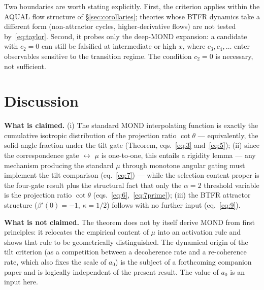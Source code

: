 \documentclass[11pt]{article}
\theoremstyle{plain}
\begin{document}
Two boundaries are worth stating explicitly. First, the criterion applies
within the AQUAL flow structure of \S\ref{sec:corollaries}; theories whose BTFR
dynamics take a different form (non-attractor cycles, higher-derivative flows)
are not tested by~\eqref{eq:taylor}. Second, it probes only the deep-MOND
expansion: a candidate with $c_{2}=0$ can still be falsified at intermediate or
high $x$, where $c_{3},c_{4},\ldots$ enter observables sensitive to the
transition regime. The condition $c_{2}=0$ is necessary, not sufficient.

\section{Discussion}\label{sec:discussion}

\noindent\textbf{What is claimed.} (i) The standard MOND interpolating function is exactly the cumulative isotropic distribution of the projection ratio $\cot\theta$ --- equivalently, the solid-angle fraction under the tilt gate (Theorem, eqs.~\eqref{eq:3} and~\eqref{eq:5}); (ii) since the correspondence gate $\leftrightarrow$ $\mu$ is one-to-one, this entails a rigidity lemma --- any mechanism producing the standard $\mu$ through monotone angular gating must implement the tilt comparison (eq.~\eqref{eq:7}) --- while the selection content proper is the four-gate result plus the structural fact that only the $\alpha=2$ threshold variable is the projection ratio $\cot\theta$ (eqs.~\eqref{eq:6},~\eqref{eq:7prime}); (iii) the BTFR attractor structure ($\beta'(0)=-1$, $\kappa=1/2$) follows with no further input (eq.~\eqref{eq:9}).

\noindent\textbf{What is not claimed.} The theorem does not by itself derive MOND from first principles: it relocates the empirical content of $\mu$ into an activation rule and shows that rule to be geometrically distinguished. The dynamical origin of the tilt criterion (as a competition between a decoherence rate and a re-coherence rate, which also fixes the scale of $a_0$) is the subject of a forthcoming companion paper and is logically independent of the present result. The value of $a_0$ is an input here.
\end{document}
